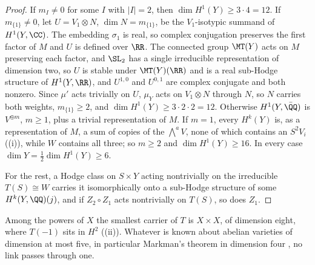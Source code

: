 \begin{proof}
If $m_{I}\ne0$ for some $I$ with $|I|=2$, then $\dim H^{1}(Y)\ge3\cdot4=12$.
If $m_{\{1\}}\ne0$, let $U=V_{1}\otimes N$, $\dim N=m_{\{1\}}$, be the
$V_{1}$-isotypic summand of $H^{1}(Y,\CC)$. The embedding $\sigma_{1}$ is
real, so complex conjugation preserves the first factor of $M$ and $U$ is
defined over $\RR$. The connected group $\MT(Y)$ acts on $M$ preserving each
factor, and $\SL_{2}$ has a single irreducible representation of dimension
two, so $U$ is stable under $\MT(Y)(\RR)$ and is a real sub-Hodge structure
of $H^{1}(Y,\RR)$, and $U^{1,0}$ and $U^{0,1}$ are complex conjugate and
both nonzero. Since $\mu'$ acts trivially on $U$, $\mu_{Y}$ acts on
$V_{1}\otimes N$ through $N$, so $N$ carries both weights, $m_{\{1\}}\ge2$, and
$\dim H^{1}(Y)\ge3\cdot2\cdot2=12$. Otherwise $H^{1}(Y,\bar{\QQ})$ is
$V^{\oplus m}$, $m\ge1$, plus a trivial representation of $M$. If $m=1$,
every $H^{k}(Y)$ is, as a representation of $M$, a sum of copies of the
$\bigwedge^{a}V$, none of which contains an $S^{2}V_{i}$
((i)), while $W$ contains all three; so $m\ge2$ and
$\dim H^{1}(Y)\ge16$. In every case $\dim Y=\frac12\dim H^{1}(Y)\ge6$.

For the rest, a Hodge class on $S\times Y$ acting nontrivially on the
irreducible $T(S)\cong W$ carries it isomorphically onto a sub-Hodge structure
of some $H^{k}(Y,\QQ)(j)$, and if $Z_{2}\circ Z_{1}$ acts nontrivially on
$T(S)$, so does $Z_{1}$.
\end{proof}

Among the powers of $X$ the smallest carrier of $T$ is $X\times X$, of
dimension eight, where $T(-1)$ sits in $H^{2}$
((ii)). Whatever is known about abelian varieties of
dimension at most five, in particular Markman's theorem in dimension four
\cite{Mar25a}, no link passes through one.

